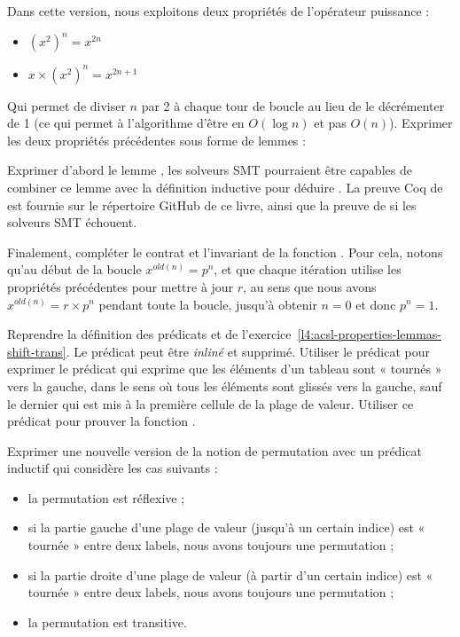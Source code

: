 Dans cette version, nous exploitons deux propriétés de l'opérateur puissance :


\begin{itemize}
\item $(x^2)^n = x^{2n}$
\item $x \times (x^2)^n = x^{2n+1}$
\end{itemize}


Qui permet de diviser $n$ par 2 à chaque tour de boucle au lieu de le décrémenter
de 1 (ce qui permet à l'algorithme d'être en $O(\log n)$ et pas $O(n)$). Exprimer
les deux propriétés précédentes sous forme de lemmes :




Exprimer d'abord le lemme , les solveurs SMT pourraient
être capables de combiner ce lemme avec la définition inductive pour déduire
. La preuve Coq de  est fournie
sur le répertoire GitHub de ce livre, ainsi que la preuve de 
si les solveurs SMT échouent.


Finalement, compléter le contrat et l'invariant de la fonction .
Pour cela, notons qu'au début de la boucle $x^{old(n)} = p^n$, et que chaque itération
utilise les propriétés précédentes pour mettre à jour $r$, au sens que nous avons
$x^{old(n)} = r \times p^n$ pendant toute la boucle, jusqu'à obtenir $n = 0$ et donc
$p ^n = 1$.






Reprendre la définition des prédicats  et 
de l'exercice~\ref{l4:acsl-properties-lemmas-shift-trans}. Le prédicat
 peut être \textit{inliné} et supprimé. Utiliser le prédicat
 pour exprimer le prédicat  qui exprime que
les éléments d'un tableau sont « tournés » vers la gauche, dans le sens où tous les
éléments sont glissés vers la gauche, sauf le dernier qui est mis à la première
cellule de la plage de valeur. Utiliser ce prédicat pour prouver la fonction
.





Exprimer une nouvelle version de la notion de permutation avec un prédicat inductif
qui considère les cas suivants :
\begin{itemize}
\item la permutation est réflexive ;
\item si la partie gauche d'une plage de valeur (jusqu'à un certain indice) est
      « tournée » entre deux labels, nous avons toujours une permutation ;
\item si la partie droite d'une plage de valeur (à partir d'un certain indice)
      est « tournée » entre deux labels, nous avons toujours une permutation ;
\item la permutation est transitive.
\end{itemize}


